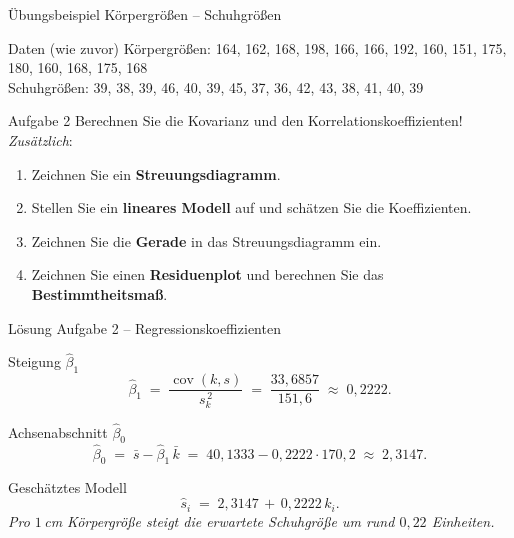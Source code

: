 \documentclass[aspectratio=169,11pt]{beamer}
\begin{document}
\begin{frame}{Übungsbeispiel Körpergrößen -- Schuhgrößen}
  \begin{block}{Daten (wie zuvor)}
    Körpergrößen: 164, 162, 168, 198, 166, 166, 192, 160, 151, 175,
    180, 160, 168, 175, 168\\
    Schuhgrößen: 39, 38, 39, 46, 40, 39, 45, 37, 36, 42, 43, 38, 41,
    40, 39
  \end{block}

  \begin{exampleblock}{Aufgabe 2}
    Berechnen Sie die Kovarianz und den Korrelationskoeffizienten!
    \emph{Zusätzlich}:
    \begin{enumerate}
      \item Zeichnen Sie ein \textbf{Streuungsdiagramm}.
      \item Stellen Sie ein \textbf{lineares Modell} auf und schätzen
            Sie die Koeffizienten.
      \item Zeichnen Sie die \textbf{Gerade} in das Streuungsdiagramm
            ein.
      \item Zeichnen Sie einen \textbf{Residuenplot} und berechnen
            Sie das \textbf{Bestimmtheitsmaß}.
    \end{enumerate}
  \end{exampleblock}
\end{frame}

\begin{frame}{Lösung Aufgabe 2 -- Regressionskoeffizienten}
  \begin{block}{Steigung $\hat{\beta}_1$}
    \[
      \hat{\beta}_1
        \;=\; \frac{\operatorname{cov}(k,s)}{s_k^{\,2}}
        \;=\; \frac{33{,}6857}{151{,}6}
        \;\approx\; 0{,}2222.
    \]
  \end{block}

  \begin{block}{Achsenabschnitt $\hat{\beta}_0$}
    \[
      \hat{\beta}_0
        \;=\; \bar{s} - \hat{\beta}_1\,\bar{k}
        \;=\; 40{,}1333 - 0{,}2222 \cdot 170{,}2
        \;\approx\; 2{,}3147.
    \]
  \end{block}

  \begin{exampleblock}{Geschätztes Modell}
    \[
      \hat{s}_i \;=\; 2{,}3147 \,+\, 0{,}2222\, k_i.
    \]
    \emph{Pro $1\,$cm Körpergröße steigt die erwartete Schuhgröße
    um rund $0{,}22$ Einheiten.}
  \end{exampleblock}
\end{frame}
\end{document}
